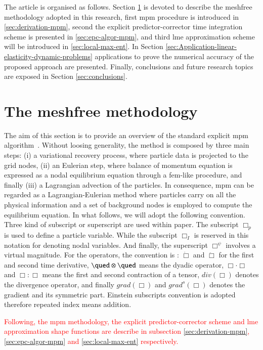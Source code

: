 \documentclass[preprint,12pt,a4paper]{elsarticle}
\newcommand{\Div}[1]{
  \ensuremath{div({#1})}
}
\newcommand\Grad[1]{grad({#1})}
\newcommand\GradS[1]{grad^s({#1})}
\newcommand{\PNA}[1]{
  \textcolor{red}{{#1}}
}
\begin{document}
The article is organised as follows. Section \ref{sec:meshfree-methodology}
is devoted to describe the meshfree methodology adopted in this
research, first \acrshort{mpm} procedure is introduced in
\ref{sec:derivation-mpm}, second the explicit predictor-corrector
time integration scheme is presented in \ref{sec:epc-algor-mpm}, and
third \acrshort{lme} approximation scheme will be introduced in
\ref{sec:local-max-ent}. In Section
\ref{sec:Application-linear-elasticity-dynamic-problems} applications
to prove the numerical accuracy of the proposed approach are
presented. Finally, conclusions and future research topics are exposed in Section \ref{sec:conclusions}.


\section{The meshfree methodology}
\label{sec:meshfree-methodology}

The aim of this section is to provide an overview of the standard
explicit \acrshort{mpm} algorithm~\cite{Sulsky1994}. Without loosing
generality, the method is composed by three main steps: (i) a
variational recovery process, where particle data is projected to the
grid nodes, (ii) an Eulerian step, where balance of momentum equation
is expressed as a nodal equilibrium equation through a \acrshort{fem}-like
procedure, and finally (iii) a Lagrangian advection of the
particles. In consequence, \acrshort{mpm} can be regarded as a
Lagrangian-Eulerian method where particles carry on all the physical
information and a set of background nodes is employed to
compute the equilibrium equation. In what follows, we will adopt the
following convention. Three kind of subscript or superscript are used
within paper. The subscript $\Box_p$ is used to define a particle
variable. While the subscript $\Box_I$ is reserved in this notation for denoting nodal
variables. And finally, the superscript $\Box^{\psi}$ involves a
virtual magnitude. For the operators, the convention is : $\dot{\Box}$ and
$\ddot{\Box}$ for the first and second time derivative, $\qued \otimes
\qued$ means the dyadic operator, $\Box \cdot \Box$ and $\Box \colon \Box$ means the
first and second contraction of a tensor, $\Div{\Box}$ denotes the
divergence operator, and finally $\Grad{\Box}$ and $\GradS{\Box}$
denotes the gradient and its symmetric part. Einstein subscripts
convention is adopted therefore repeated index means addition.  

\PNA{Following, the \acrshort{mpm} methodology, the explicit predictor-corrector scheme and \acrshort{lme} approximation shape functions are describe in subsection \ref{sec:derivation-mpm},\ref{sec:epc-algor-mpm} and \ref{sec:local-max-ent} respectively.}
\end{document}
